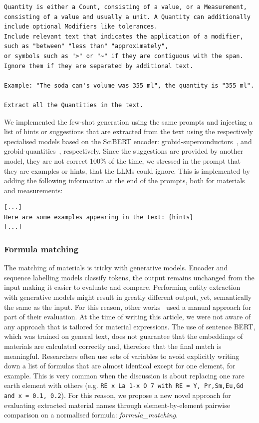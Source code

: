 \documentclass[a4paper]{article}
\begin{document}
\begin{lstlisting}[caption=User prompt designed for extracting properties from text. ]
Quantity is either a Count, consisting of a value, or a Measurement, 
consisting of a value and usually a unit. A Quantity can additionally include optional Modifiers like tolerances.
Include relevant text that indicates the application of a modifier, such as "between" "less than" "approximately", 
or symbols such as ">" or "~" if they are contiguous with the span. Ignore them if they are separated by additional text.
 
Example: "The soda can's volume was 355 ml", the quantity is "355 ml".

Extract all the Quantities in the text.
\end{lstlisting}

We implemented the few-shot generation using the same prompts and injecting a list of hints or suggestions that are extracted from the text using the respectively specialised models based on the SciBERT encoder: grobid-superconductors~\cite{lfoppiano2023automatic}, and grobid-quantities~\cite{foppiano2019quantities}, respectively.
Since the suggestions are provided by another model, they are not correct 100\% of the time, we stressed in the prompt that they are examples or hints, that the LLMs could ignore. 
This is implemented by adding the following information at the end of the prompts, both for materials and measurements:

\begin{lstlisting}[caption=Few shot information suffixed to the prompt]
[...]
Here are some examples appearing in the text: {hints}
[...]
\end{lstlisting}


\subsubsection{Formula matching}

The matching of materials is tricky with generative models. Encoder and sequence labelling models classify tokens, the output remains unchanged from the input making it easier to evaluate and compare. 
Performing entity extraction with generative models might result in greatly different output, yet, semantically the same as the input. For this reason, other works~\cite{taylor2022galactica} used a manual approach for part of their evaluation. 
At the time of writing this article, we were not aware of any approach that is tailored for material expressions. 
The use of sentence BERT, which was trained on general text, does not guarantee that the embeddings of materials are calculated correctly and, therefore that the final match is meaningful. 
Researchers often use sets of variables to avoid explicitly writing down a list of formulas that are almost identical except for one element, for example. This is very common when the discussion is about replacing one rare earth element with others (e.g. \texttt{RE x La 1-x O 7 with RE = Y, Pr,Sm,Eu,Gd and x = 0.1, 0.2}). 
For this reason, we propose a new novel approach for evaluating extracted material names through element-by-element pairwise comparison on a normalised formula: \textit{formula\_matching}.
\end{document}
